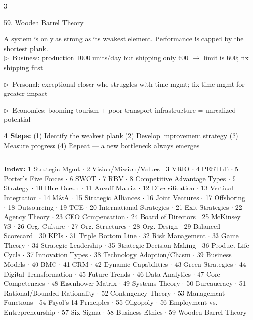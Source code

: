 \documentclass[7.5pt, letterpaper]{article}
\newcommand{\concept}[1]{%
  \vspace{2.5pt}%
  \noindent\colorbox{accent}{\parbox{\dimexpr\linewidth-2\fboxsep}{\fontsize{6.8pt}{7.5pt}\selectfont\bfseries\color{white}\strut #1\strut}}%
  \vspace{1pt}\par%
}
\newcommand{\kv}[2]{\noindent\textbf{#1:} #2\par}
\newcommand{\bul}[1]{\noindent$\triangleright$\ #1\par}
\begin{document}
\begin{multicols}{3}
\concept{59. Wooden Barrel Theory}
A system is only as strong as its weakest element. Performance is capped by the shortest plank.\\
\bul{Business: production 1000 units/day but shipping only 600 $\to$ limit is 600; fix shipping first}
\bul{Personal: exceptional closer who struggles with time mgmt; fix time mgmt for greater impact}
\bul{Economics: booming tourism + poor transport infrastructure = unrealized potential}
\kv{4 Steps}{(1) Identify the weakest plank (2) Develop improvement strategy (3) Measure progress (4) Repeat --- a new bottleneck always emerges}

\end{multicols}

\vspace{2pt}
{\color{ruled}\hrule}
\vspace{2pt}
\begin{center}
{\fontsize{5.8pt}{7pt}\selectfont\color{darkgray}
\textbf{Index:} 1 Strategic Mgmt $\cdot$ 2 Vision/Mission/Values $\cdot$ 3 VRIO $\cdot$ 4 PESTLE $\cdot$ 5 Porter's Five Forces $\cdot$ 6 SWOT $\cdot$ 7 RBV $\cdot$ 8 Competitive Advantage Types $\cdot$ 9 Strategy $\cdot$ 10 Blue Ocean $\cdot$ 11 Ansoff Matrix $\cdot$ 12 Diversification $\cdot$ 13 Vertical Integration $\cdot$ 14 M\&A $\cdot$ 15 Strategic Alliances $\cdot$ 16 Joint Ventures $\cdot$ 17 Offshoring $\cdot$ 18 Outsourcing $\cdot$ 19 TCE $\cdot$ 20 International Strategies $\cdot$ 21 Exit Strategies $\cdot$ 22 Agency Theory $\cdot$ 23 CEO Compensation $\cdot$ 24 Board of Directors $\cdot$ 25 McKinsey 7S $\cdot$ 26 Org. Culture $\cdot$ 27 Org. Structures $\cdot$ 28 Org. Design $\cdot$ 29 Balanced Scorecard $\cdot$ 30 KPIs $\cdot$ 31 Triple Bottom Line $\cdot$ 32 Risk Management $\cdot$ 33 Game Theory $\cdot$ 34 Strategic Leadership $\cdot$ 35 Strategic Decision-Making $\cdot$ 36 Product Life Cycle $\cdot$ 37 Innovation Types $\cdot$ 38 Technology Adoption/Chasm $\cdot$ 39 Business Models $\cdot$ 40 BMC $\cdot$ 41 CRM $\cdot$ 42 Dynamic Capabilities $\cdot$ 43 Green Strategies $\cdot$ 44 Digital Transformation $\cdot$ 45 Future Trends $\cdot$ 46 Data Analytics $\cdot$ 47 Core Competencies $\cdot$ 48 Eisenhower Matrix $\cdot$ 49 Systems Theory $\cdot$ 50 Bureaucracy $\cdot$ 51 Rational/Bounded Rationality $\cdot$ 52 Contingency Theory $\cdot$ 53 Management Functions $\cdot$ 54 Fayol's 14 Principles $\cdot$ 55 Oligopoly $\cdot$ 56 Employment vs. Entrepreneurship $\cdot$ 57 Six Sigma $\cdot$ 58 Business Ethics $\cdot$ 59 Wooden Barrel Theory
}
\end{center}
\end{document}
